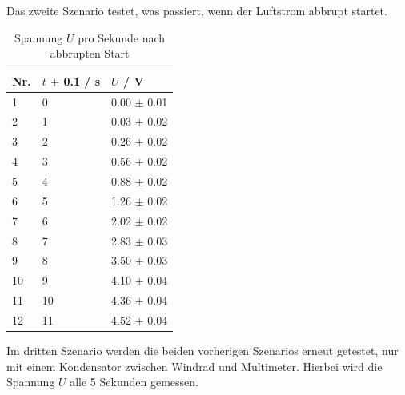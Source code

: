 \documentclass[12pt,a4paper,twoside]{article}
\begin{document}
\noindent
Das zweite Szenario testet, was passiert, wenn der Luftstrom abbrupt startet. 
\begin{table}[H]
    \centering
    \caption{Spannung $U$ pro Sekunde nach abbrupten Start}
    \label{tab:Messdaten Windkraft abbrupt start}
    \begin{tabular}{| l | l | l |}
        \hline
        Nr. & $t$ $\pm $ 0.1 / s & $U$ / V \\
        \hline
        1  & 0  & 0.00 $\pm$ 0.01   \\
        2  & 1  & 0.03 $\pm$ 0.02   \\
        3  & 2  & 0.26 $\pm$ 0.02   \\
        4  & 3  & 0.56 $\pm$ 0.02   \\
        5  & 4  & 0.88 $\pm$ 0.02   \\
        6  & 5  & 1.26 $\pm$ 0.02   \\
        7  & 6  & 2.02 $\pm$ 0.02   \\
        8  & 7  & 2.83 $\pm$ 0.03   \\
        9  & 8  & 3.50 $\pm$ 0.03   \\
        10 & 9  & 4.10 $\pm$ 0.04   \\
        11 & 10 & 4.36 $\pm$ 0.04   \\
        12 & 11 & 4.52 $\pm$ 0.04   \\
        \hline  
    \end{tabular}
\end{table}

\noindent
Im dritten Szenario werden die beiden vorherigen Szenarios erneut getestet, nur mit einem Kondensator zwischen Windrad und Multimeter. 
Hierbei wird die Spannung $U$ alle 5 Sekunden gemessen. 
\end{document}
